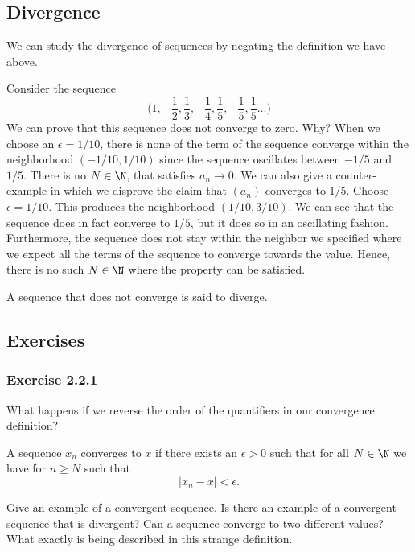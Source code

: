 \subsection{Divergence}

We can study the divergence of sequences by negating the definition we have above. 
\begin{ex}
Consider the sequence 
\[ \Big(1, -\frac{1}{2}, \frac{1}{3}, -\frac{1}{4}, \frac{1}{5}, -\frac{1}{5}, \frac{1}{5}...  \Big)\]
We can prove that this sequence does not converge to zero. Why? When we choose an \( \epsilon  = 1/10 \), there is none of the term of the sequence converge within the neighborhood \( (-1/10, 1/10 )\) since the sequence oscillates between \(-1 / 5 \)  and \( 1 / 5\). There is no \( N \in \N \), that satisfies \( a_n \to 0 \). We can also give a counter-example in which we disprove the claim that \( (a_n) \) converges to \( 1 / 5 \). Choose \( \epsilon = 1 / 10 \). This produces the neighborhood \( (1/10, 3/10 ) \). We can see that the sequence does in fact converge to \( 1 / 5 \), but it does so in an oscillating fashion. Furthermore, the sequence does not stay within the neighbor we specified where we expect all the terms of the sequence to converge towards the value. Hence, there is no such \( N \in \N \) where the property can be satisfied.  
\end{ex}


\begin{tcolorbox} 
\begin{defn}
A sequence that does not converge is said to diverge.
\end{defn}
\end{tcolorbox}


\subsection{Exercises}

\subsubsection{Exercise 2.2.1} What happens if we reverse the order of the quantifiers in our convergence definition? 
\begin{tcolorbox}
    \begin{defn}[Reversed]
A sequence \( x_n \) converges to \( x \) if there exists an \( \epsilon > 0 \) such that for all \( N \in \N \) we have for \( n \geq N \) such that 
\[ |x_n  - x| < \epsilon.\]
\end{defn}
\end{tcolorbox}
Give an example of a convergent sequence. Is there an example of a convergent sequence that is divergent? Can a sequence converge to two different values? What exactly is being described in this strange definition.


